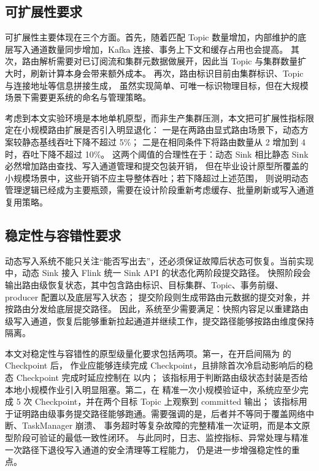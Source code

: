 \subsection{可扩展性要求}

可扩展性主要体现在三个方面。首先，随着匹配 Topic 数量增加，内部维护的底层写入通道数量同步增加，Kafka 连接、事务上下文和缓存占用也会提高。
其次，路由解析需要对已订阅流和集群元数据做展开，因此当 Topic 与集群数量扩大时，刷新计算本身会带来额外成本。
再次，路由标识目前由集群标识、Topic 与连接地址等信息拼接生成，
虽然实现简单、可唯一标识物理目标，但在大规模场景下需要更系统的命名与管理策略。

考虑到本文实验环境是本地单机原型，而非生产集群压测，本文把可扩展性指标限定在小规模路由扩展是否引入明显退化：
一是在两路由显式路由场景下，动态方案较静态基线吞吐下降不超过 5\%；
二是在相同条件下将路由数量从 2 增加到 4 时，吞吐下降不超过 10\%。
这两个阈值的合理性在于：动态 Sink 相比静态 Sink 必然增加路由查找、写入通道管理和提交包装开销，
但在毕业设计原型所覆盖的小规模场景中，这些开销不应主导整体吞吐；若下降超过上述范围，
则说明动态管理逻辑已经成为主要瓶颈，需要在设计阶段重新考虑缓存、批量刷新或写入通道复用策略。

\subsection{稳定性与容错性要求}

动态写入系统不能只关注“能否写出去”，还必须保证故障后状态可恢复。当前实现中，动态 Sink 接入 Flink 统一 Sink API 的状态化两阶段提交路径。
快照阶段会输出路由级恢复状态，其中包含路由标识、目标集群、Topic、事务前缀、producer 配置以及底层写入状态；
提交阶段则生成带路由元数据的提交对象，并按路由分发给底层提交路径。
因此，系统至少需要满足：快照内容足以重建路由级写入通道，恢复后能够重新拉起通道并继续工作，提交路径能够按路由维度保持隔离。

本文对稳定性与容错性的原型级量化要求包括两项。第一，在开启间隔为  的 Checkpoint 后，
作业应能够连续完成 Checkpoint，且排除首次冷启动影响后的稳态 Checkpoint 完成时延应控制在  以内；
该指标用于判断路由级状态封装是否给本地小规模作业引入明显阻塞。第二，在
精准一次小规模验证中，系统应至少完成 5 次 Checkpoint，并在两个目标 Topic 上观察到 committed 输出；
该指标用于证明路由级事务提交路径能够跑通。需要强调的是，后者并不等同于覆盖网络中断、TaskManager 崩溃、
事务超时等复杂故障的完整精准一次证明，而是本文原型阶段可验证的最低一致性闭环。
与此同时，日志、监控指标、异常处理与精准一次路径下退役写入通道的安全清理等工程能力，
仍是进一步增强稳定性的重点。

